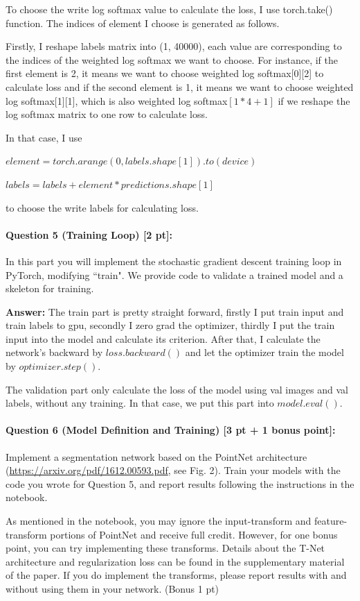 \documentclass[11pt]{article}
\begin{document}
To choose the write log softmax value to calculate the loss, I use torch.take() function. The indices of element I choose is generated as follows.

Firstly, I reshape labels matrix into (1, 40000), each value are corresponding to the indices of the weighted log softmax we want to choose. 
For instance, if the first element is 2, it means we want to choose weighted log softmax[0][2] to calculate loss and if the second element is 1, it means we want to choose weighted log softmax[1][1], which is also weighted log softmax$[1 * 4 + 1]$ if we reshape the log softmax matrix to one row to calculate loss.

In that case, I use 

$element = torch.arange(0, labels.shape[1]).to(device)$

$labels = labels + element * predictions.shape[1]$

to choose the write labels for calculating loss.

\paragraph{Question 5 (Training Loop) [2 pt]:} 
In this part you will implement the stochastic gradient descent training loop in PyTorch, modifying ``train". We provide code to validate a trained model and a skeleton for training. 

\textbf{Answer:} The train part is pretty straight forward, firstly I put train input and train labels to gpu, secondly I zero grad the optimizer, thirdly I put the train input into the model and calculate its criterion. After that, I calculate the network's backward by $loss.backward()$ and let the optimizer train the model by $optimizer.step()$.

The validation part only calculate the loss of the model using val images and val labels, without any training. In that case, we put this part into $model.eval()$.

\paragraph{Question 6 (Model Definition and Training) [3 pt + 1 bonus point]:} 
Implement a segmentation network based on the PointNet architecture (\url{https://arxiv.org/pdf/1612.00593.pdf}, see Fig. 2). Train your models with the code you wrote for Question 5, and report results following the instructions in the notebook. 

As mentioned in the notebook, you may ignore the input-transform and feature-transform portions of PointNet and receive full credit. However, for one bonus point, you can try implementing these transforms. Details about the T-Net architecture and regularization loss can be found in the supplementary material of the paper. If you do implement the transforms, please report results with and without using them in your network. (Bonus 1 pt)
\end{document}
